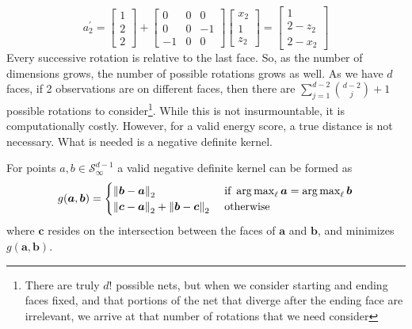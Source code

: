   \begin{equation}
    \label{eq:2drotation}
    a_2^{\prime} = \begin{bmatrix}
    1 \\
    2 \\
    2
    \end{bmatrix}
    +
    \begin{bmatrix}
    0 & 0 & 0  \\
    0 & 0 & -1 \\
    -1 & 0 & 0
    \end{bmatrix}
    \begin{bmatrix}
    x_2 \\
    1 \\
    z_2
    \end{bmatrix} = \begin{bmatrix}
    1 \\
    2 - z_2 \\
    2 - x_2
    \end{bmatrix}
  \end{equation}
Every successive rotation is relative to the last face.  So, as the number of dimensions grows, the
  number of possible rotations grows as well.  As we have $d$ faces, if 2 observations are on
  different faces, then there are $\sum_{j = 1}^{d-2}\binom{d-2}{j} + 1$ possible rotations to
  consider\footnote{There are truly $d!$ possible nets, but when we consider starting and ending
  faces fixed, and that portions of the net that diverge after the ending face are irrelevant,
  we arrive at that number of rotations that we need consider}.  While this is not
  insurmountable, it is computationally costly. However, for a valid energy score, a true distance
  is not necessary.  What is needed is a negative definite kernel.

\begin{prop}
For points $a,b \in \mathcal{S}_{\infty}^{d-1}$ a valid negative definite kernel can be formed as
  \begin{equation}
    g(\bm{a},\bm{b}) = \begin{cases}
        \pnorm{\bm{b}-\bm{a}}{2} &\text{ if }\argmax_{\ell}\bm{a} = \argmax_{\ell}\bm{b}\\
        \pnorm{\bm{c}-\bm{a}}{2} + \pnorm{\bm{b}-\bm{c}}{2} &\text{ otherwise}
    \end{cases}
  \end{equation}
  where $\bm{c}$ resides on the intersection between the faces of $\bm{a}$ and $\bm{b}$, and minimizes $g(\bm{a},\bm{b})$.
\end{prop}

